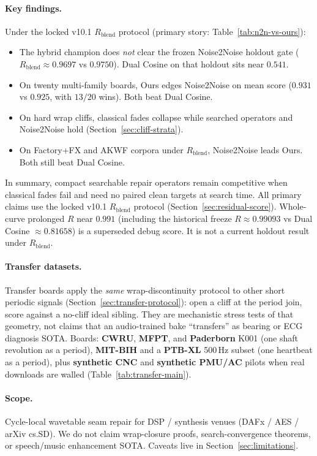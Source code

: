 \paragraph{Key findings.}
Under the locked v10.1 $R_{\mathrm{blend}}$ protocol (primary story: Table~\ref{tab:n2n-vs-ours}):
\begin{itemize}
  \item The hybrid champion does \emph{not} clear the frozen Noise2Noise holdout gate
    ($R_{\mathrm{blend}}{\approx}0.9697$ vs $0.9750$). Dual Cosine on that holdout sits near $0.541$.
  \item On twenty multi-family boards, Ours edges Noise2Noise on mean score ($0.931$ vs $0.925$, with $13/20$ wins). Both beat Dual Cosine.
  \item On hard wrap cliffs, classical fades collapse while searched operators and Noise2Noise hold (Section~\ref{sec:cliff-strata}).
  \item On Factory+FX and AKWF corpora under $R_{\mathrm{blend}}$, Noise2Noise leads Ours. Both still beat Dual Cosine.
\end{itemize}
In summary, compact searchable repair operators remain competitive when classical fades fail and need no paired clean targets at search time.
All primary claims use the locked v10.1 $R_{\mathrm{blend}}$ protocol (Section~\ref{sec:residual-score}).
Whole-curve prolonged $R$ near $0.991$ (including the historical freeze $R{\approx}0.99093$ vs Dual Cosine ${\approx}0.81658$) is a superseded debug score.
It is not a current holdout result under $R_{\mathrm{blend}}$.

\paragraph{Transfer datasets.}
Transfer boards apply the \emph{same} wrap-discontinuity protocol to other short periodic signals
(Section~\ref{sec:transfer-protocol}): open a cliff at the period join, score against a no-cliff ideal sibling.
They are mechanistic stress tests of that geometry, not claims that an audio-trained bake ``transfers'' as bearing or ECG diagnosis SOTA.
Boards: \textbf{CWRU}, \textbf{MFPT}, and \textbf{Paderborn} K001 (one shaft revolution as a period),
\textbf{MIT-BIH} and a \textbf{PTB-XL} 500\,Hz subset (one heartbeat as a period),
plus \textbf{synthetic CNC} and \textbf{synthetic PMU/AC} pilots when real downloads are walled
(Table~\ref{tab:transfer-main}).

\paragraph{Scope.}
Cycle-local wavetable seam repair for DSP / synthesis venues (DAFx / AES / arXiv cs.SD).
We do not claim wrap-closure proofs, search-convergence theorems, or speech/music enhancement SOTA.
Caveats live in Section~\ref{sec:limitations}.

